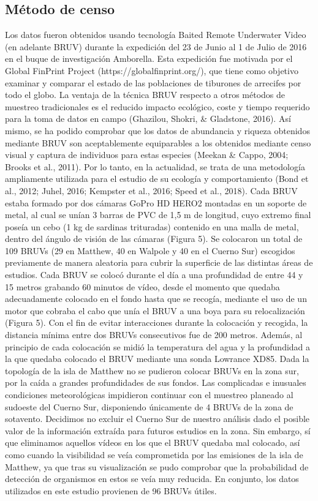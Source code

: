 \documentclass[a4paper, 11pt]{article}
\begin{document}
\subsection{Método de censo}
Los datos fueron obtenidos usando tecnología Baited Remote Underwater Video (en adelante BRUV) durante la expedición del 23 de Junio al 1 de Julio de 2016 en el buque de investigación Amborella. Esta expedición fue motivada por el Global FinPrint Project (https://globalfinprint.org/), que tiene como objetivo examinar y comparar el estado de las poblaciones de tiburones de arrecifes por todo el globo. La ventaja de la técnica BRUV respecto a otros métodos de muestreo tradicionales es el reducido impacto ecológico, coste y tiempo requerido para la toma de datos en campo (Ghazilou, Shokri, & Gladstone, 2016).  Así mismo, se ha podido comprobar que los datos de abundancia y riqueza obtenidos mediante BRUV son aceptablemente equiparables a los obtenidos mediante censo visual y captura de individuos para estas especies (Meekan & Cappo, 2004; Brooks et al., 2011). Por lo tanto, en la actualidad, se trata de una metodología ampliamente utilizada para el estudio de su ecología y comportamiento (Bond et al., 2012; Juhel, 2016; Kempster et al., 2016; Speed et al., 2018).
Cada BRUV estaba formado por dos cámaras GoPro HD HERO2 montadas en un soporte de metal, al cual se unían 3 barras de PVC de 1,5 m de longitud, cuyo extremo final poseía un cebo (1 kg de sardinas trituradas) contenido en una malla de metal, dentro del ángulo de visión de las cámaras (Figura 5). Se colocaron un total de 109 BRUVs (29 en Matthew, 40 en Walpole y 40 en el Cuerno Sur) escogidos previamente de manera aleatoria para cubrir la superficie de las distintas áreas de estudios. Cada BRUV se colocó durante el día a una profundidad de entre 44 y 15 metros grabando 60 minutos de vídeo, desde el momento que quedaba adecuadamente colocado en el fondo hasta que se recogía, mediante el uso de un motor que cobraba el cabo que unía el BRUV a una boya para su relocalización (Figura 5). Con el fin de evitar interacciones durante la colocación y recogida, la distancia mínima entre dos BRUVs consecutivos fue de 200 metros. Además, al principio de cada colocación se midió la temperatura del agua y la profundidad a la que quedaba colocado el BRUV mediante una sonda Lowrance XD85. 
Dada la topología de la isla de Matthew no se pudieron colocar BRUVs en la zona sur, por la caída a grandes profundidades de sus fondos. Las complicadas e inusuales condiciones meteorológicas impidieron continuar con el muestreo planeado al sudoeste del Cuerno Sur, disponiendo únicamente de 4 BRUVs de la zona de sotavento. Decidimos no excluir el Cuerno Sur de nuestro análisis dado el posible valor de la información extraída para futuros estudios en la zona. Sin embargo, sí que eliminamos aquellos vídeos en los que el BRUV quedaba mal colocado, así como cuando la visibilidad se veía comprometida por las emisiones de la isla de Matthew, ya que tras su visualización se pudo comprobar que la probabilidad de detección de organismos en estos se veía muy reducida. En conjunto, los datos utilizados en este estudio provienen de 96 BRUVs útiles.
\end{document}
